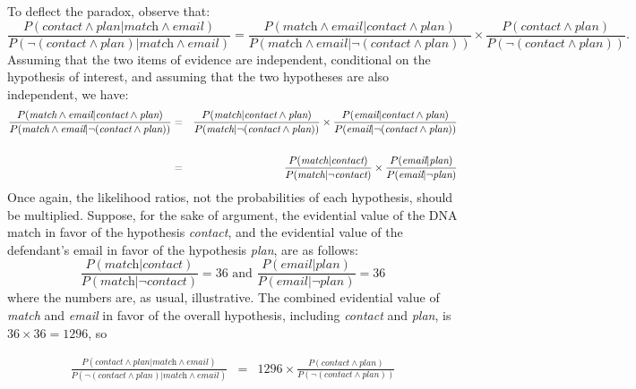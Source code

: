 \documentclass[10pt]{article}
\begin{document}
To deflect the paradox, observe that:
\[ \frac{P(\textit{contact}\wedge \textit{plan} | \textit{match} \wedge \textit{email})}{P(\neg (\textit{contact} \wedge \textit{plan}) |  \textit{match} \wedge \textit{email})} 
=
\frac{P(\textit{match} \wedge \textit{email} | \textit{contact}\wedge \textit{plan})}{P(\textit{match} \wedge \textit{email} | \neg (\textit{contact} \wedge \textit{plan}))}
\times
\frac{P(\textit{contact}\wedge \textit{plan})}{P(\neg (\textit{contact} \wedge \textit{plan}))}
.\]
%
 Assuming that the two items of evidence are independent, conditional on 
 the hypothesis of interest, and assuming that the two hypotheses are also independent, we have:
 \begin{eqnarray*}
 \frac{P(\textit{match} \wedge \textit{email} | \textit{contact}\wedge \textit{plan})}{P(\textit{match} \wedge \textit{email} | \neg (\textit{contact} \wedge \textit{plan}))}  
 & = &  \frac{P(\textit{match} | \textit{contact}\wedge \textit{plan})}{P(\textit{match} | \neg (\textit{contact} \wedge \textit{plan}))}  \times 
 \frac{P( \textit{email} | \textit{contact}\wedge \textit{plan})}{P(\textit{email} | \neg (\textit{contact} \wedge \textit{plan}))}  \notag\\ 
 && \notag\\
 & = & \frac{P(\textit{match} | \textit{contact})}{P(\textit{match} | \neg \textit{contact})}  \times  
 \frac{P( \textit{email} | \textit{plan})}{P(\textit{email} | \neg \textit{plan})}  \notag\\
 \end{eqnarray*}
%
Once again, the likelihood ratios, not the 
probabilities of each hypothesis, should be multiplied.  
Suppose, for the sake of argument, the evidential value of the DNA match in favor 
of the hypothesis \textit{contact}, 
and the evidential value of the defendant's email in favor of 
the hypothesis \textit{plan}, are as follows:
%
\[\frac{P(\textit{match}| \textit{contact})}{P(\textit{match} | \neg \textit{contact})}=36 \text{ and } \frac{P(\textit{email}| \textit{plan})}{P(\textit{email}| \neg \textit{plan})}=36\]
%
where the numbers are, as usual, illustrative. The combined evidential value of \textit{match} and \textit{email} 
in favor of the overall hypothesis, including \textit{contact} and \textit{plan}, is $36\times 36 = 1296$, so 
 
  \begin{eqnarray*} %
 \frac{P(\textit{contact}\wedge \textit{plan} | \textit{match} \wedge \textit{email})}{P(\neg (\textit{contact} \wedge \textit{plan}) |  \textit{match} \wedge \textit{email})} 
 & = & 1296  \times 
\frac{P(\textit{contact}\wedge \textit{plan})}{P(\neg (\textit{contact} \wedge \textit{plan}))} \\ 
  \end{eqnarray*} 
  
\end{document}
